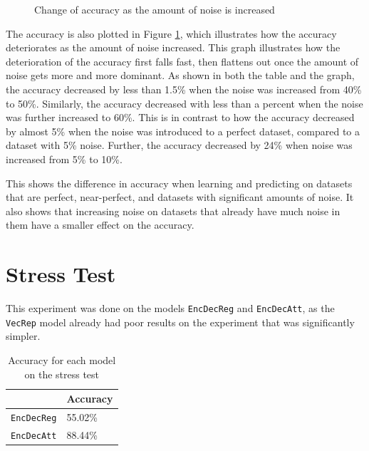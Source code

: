 \begin{figure}[H]
    \centering
    \captionsetup{justification=centering}
    \caption{Change of accuracy as the amount of noise is increased}
    \label{fig:noise_accuracy}
\end{figure}

The accuracy is also plotted in Figure \ref{fig:noise_accuracy}, which illustrates how the accuracy deteriorates as the amount of noise increased. This graph illustrates how the deterioration of the accuracy first falls fast, then flattens out once the amount of noise gets more and more dominant. As shown in both the table and the graph, the accuracy decreased by less than 1.5\% when the noise was increased from 40\% to 50\%. Similarly, the accuracy decreased with less than a percent when the noise was further increased to 60\%. This is in contrast to how the accuracy decreased by almost 5\% when the noise was introduced to a perfect dataset, compared to a dataset with 5\% noise. Further, the accuracy decreased by 24\% when noise was increased from 5\% to 10\%.

This shows the difference in accuracy when learning and predicting on datasets that are perfect, near-perfect, and datasets with significant amounts of noise. It also shows that increasing noise on datasets that already have much noise in them have a smaller effect on the accuracy.


\section{Stress Test}
\label{sec:stress_test}
This experiment was done on the models {\tt EncDecReg} and {\tt EncDecAtt}, as the {\tt VecRep} model already had poor results on the experiment that was significantly simpler.

\begin{table}[H]
    \centering
    \begin{tabular}{|l|l|}
        \hline 
                                        & \textbf{Accuracy}         \\ \hline
        {\tt EncDecReg}                 & 55.02\%                   \\ \hline
        {\tt EncDecAtt}                 & 88.44\%                   \\ \hline
    \end{tabular}
    \caption{Accuracy for each model on the stress test}
    \label{table:accuracy_stress_test}
\end{table}

